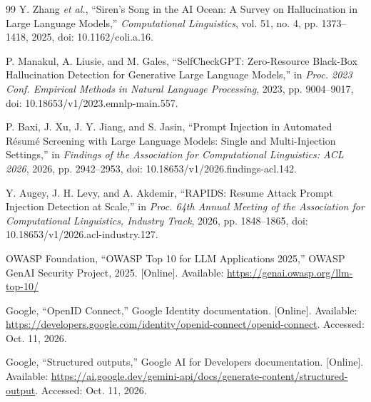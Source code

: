 \documentclass[conference]{IEEEtran}
\begin{document}
\begin{thebibliography}{99}
Y. Zhang \emph{et al.},
``Siren's Song in the AI Ocean: A Survey on Hallucination in Large Language Models,''
\emph{Computational Linguistics}, vol. 51, no. 4, pp. 1373--1418, 2025, doi: 10.1162/coli.a.16.

P. Manakul, A. Liusie, and M. Gales,
``SelfCheckGPT: Zero-Resource Black-Box Hallucination Detection for Generative Large Language Models,''
in \emph{Proc. 2023 Conf. Empirical Methods in Natural Language Processing}, 2023, pp. 9004--9017, doi: 10.18653/v1/2023.emnlp-main.557.

P. Baxi, J. Xu, J. Y. Jiang, and S. Jasin,
``Prompt Injection in Automated R\'{e}sum\'{e} Screening with Large Language Models: Single and Multi-Injection Settings,''
in \emph{Findings of the Association for Computational Linguistics: ACL 2026}, 2026, pp. 2942--2953, doi: 10.18653/v1/2026.findings-acl.142.

Y. Augey, J. H. Levy, and A. Akdemir,
``RAPIDS: Resume Attack Prompt Injection Detection at Scale,''
in \emph{Proc. 64th Annual Meeting of the Association for Computational Linguistics, Industry Track}, 2026, pp. 1848--1865, doi: 10.18653/v1/2026.acl-industry.127.

OWASP Foundation,
``OWASP Top 10 for LLM Applications 2025,''
OWASP GenAI Security Project, 2025. [Online]. Available: \url{https://genai.owasp.org/llm-top-10/}

Google,
``OpenID Connect,''
Google Identity documentation. [Online]. Available: \url{https://developers.google.com/identity/openid-connect/openid-connect}. Accessed: Oct. 11, 2026.

Google,
``Structured outputs,''
Google AI for Developers documentation. [Online]. Available:
\url{https://ai.google.dev/gemini-api/docs/generate-content/structured-output}.
Accessed: Oct. 11, 2026.

\end{thebibliography}
\end{document}

